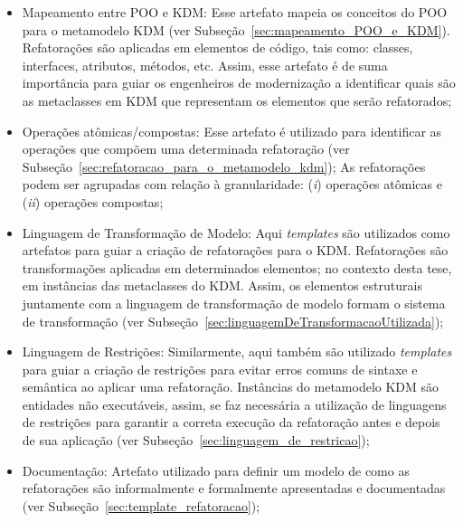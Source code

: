 \begin{itemize}
\item Mapeamento entre POO e KDM: Esse artefato mapeia os conceitos do POO para o metamodelo KDM (ver Subseção~\ref{sec:mapeamento_POO_e_KDM}). Refatorações são aplicadas em elementos de código, tais como: classes, interfaces, atributos, métodos, etc. Assim, esse artefato é de suma importância para guiar os engenheiros de modernização a identificar quais são as metaclasses em KDM que representam os elementos que serão refatorados;

\item Operações atômicas/compostas: Esse artefato é utilizado para identificar as operações que compõem uma determinada refatoração (ver Subseção~\ref{sec:refatoracao_para_o_metamodelo_kdm}); As refatorações podem ser agrupadas com relação à granularidade: (\textit{i}) operações atômicas e (\textit{ii}) operações compostas;

\item Linguagem de Transformação de Modelo: Aqui \textit{templates} são utilizados como artefatos para guiar a criação de refatorações para o KDM. Refatorações são transformações aplicadas em determinados elementos; no contexto desta tese, em instâncias das metaclasses do KDM. Assim, os elementos estruturais juntamente com a linguagem de transformação de modelo formam o sistema de transformação (ver Subseção~\ref{sec:linguagemDeTransformacaoUtilizada});

\item Linguagem de Restrições: Similarmente, aqui também são utilizado \textit{templates} para guiar a criação de restrições para evitar erros comuns de sintaxe e semântica ao aplicar uma refatoração. Instâncias do metamodelo KDM são entidades não executáveis, assim, se faz necessária a utilização de linguagens de restrições para garantir a correta execução da refatoração antes e depois de sua aplicação (ver Subseção~\ref{sec:linguagem_de_restricao});

\item Documentação: Artefato utilizado para definir um modelo de como as refatorações são informalmente e formalmente apresentadas e documentadas (ver Subseção~\ref{sec:template_refatoracao});


\end{itemize}

